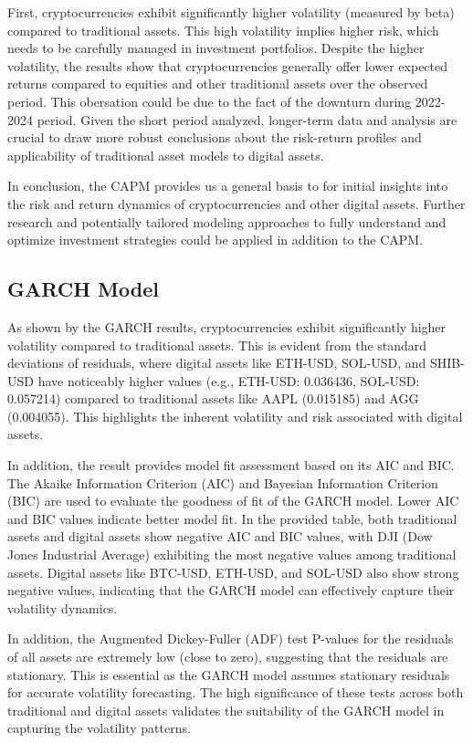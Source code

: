 First, cryptocurrencies exhibit significantly higher volatility (measured by beta) compared to traditional assets. This high volatility implies higher risk, which needs to be carefully managed in investment portfolios.
Despite the higher volatility, the results show that cryptocurrencies generally offer lower expected returns compared to equities and other traditional assets over the observed period. This obersation could be due to the fact of the downturn during 2022-2024 period. Given the short period analyzed, longer-term data and analysis are crucial to draw more robust conclusions about the risk-return profiles and applicability of traditional asset models to digital assets.

In conclusion, the CAPM provides us a general basis to for initial insights into the risk and return dynamics of cryptocurrencies and other digital assets. Further research and potentially tailored modeling approaches to fully understand and optimize investment strategies could be applied in addition to the CAPM.

\subsection{GARCH Model}

As shown by the GARCH results, cryptocurrencies exhibit significantly higher volatility compared to traditional assets. This is evident from the standard deviations of residuals, where digital assets like ETH-USD, SOL-USD, and SHIB-USD have noticeably higher values (e.g., ETH-USD: 0.036436, SOL-USD: 0.057214) compared to traditional assets like AAPL (0.015185) and AGG (0.004055). This highlights the inherent volatility and risk associated with digital assets.

In addition, the result provides model fit assessment based on its AIC and BIC. The Akaike Information Criterion (AIC) and Bayesian Information Criterion (BIC) are used to evaluate the goodness of fit of the GARCH model. Lower AIC and BIC values indicate better model fit. In the provided table, both traditional assets and digital assets show negative AIC and BIC values, with DJI (Dow Jones Industrial Average) exhibiting the most negative values among traditional assets. Digital assets like BTC-USD, ETH-USD, and SOL-USD also show strong negative values, indicating that the GARCH model can effectively capture their volatility dynamics.

In addition, the Augmented Dickey-Fuller (ADF) test P-values for the residuals of all assets are extremely low (close to zero), suggesting that the residuals are stationary. This is essential as the GARCH model assumes stationary residuals for accurate volatility forecasting. The high significance of these tests across both traditional and digital assets validates the suitability of the GARCH model in capturing the volatility patterns.

